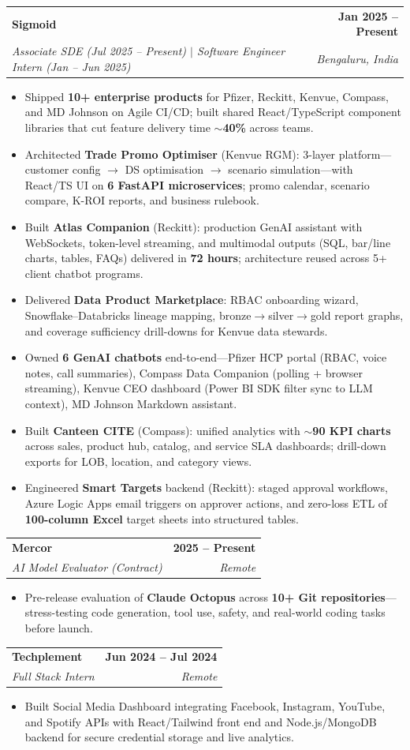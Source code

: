 \documentclass[letterpaper,11pt]{article}
\makeatletter
\newcommand{\resumeItem}[1]{
  \item\small{
    {#1 \vspace{-2pt}}
  }
}
\newcommand{\resumeSubheading}[4]{
  \vspace{-2pt}\item
    \begin{tabular*}{1.0\textwidth}[t]{l@{\extracolsep{\fill}}r}
      \textbf{#1} & \textbf{\small #2} \\
      \textit{\small#3} & \textit{\small #4} \\
    \end{tabular*}\vspace{-7pt}
}
\newcommand{\resumeItemListStart}{\begin{itemize}}
\newcommand{\resumeItemListEnd}{\end{itemize}\vspace{-5pt}}
\makeatother
\begin{document}
    \resumeSubheading
      {Sigmoid}{Jan 2025 -- Present}
      {Associate SDE (Jul 2025 -- Present) $|$ Software Engineer Intern (Jan -- Jun 2025)}{Bengaluru, India}
      \resumeItemListStart
        \resumeItem{Shipped \textbf{10+ enterprise products} for Pfizer, Reckitt, Kenvue, Compass, and MD Johnson on Agile CI/CD; built shared React/TypeScript component libraries that cut feature delivery time \textbf{$\sim$40\%} across teams.}
        \resumeItem{Architected \textbf{Trade Promo Optimiser} (Kenvue RGM): 3-layer platform---customer config $\rightarrow$ DS optimisation $\rightarrow$ scenario simulation---with React/TS UI on \textbf{6 FastAPI microservices}; promo calendar, scenario compare, K-ROI reports, and business rulebook.}
        \resumeItem{Built \textbf{Atlas Companion} (Reckitt): production GenAI assistant with WebSockets, token-level streaming, and multimodal outputs (SQL, bar/line charts, tables, FAQs) delivered in \textbf{72 hours}; architecture reused across 5+ client chatbot programs.}
        \resumeItem{Delivered \textbf{Data Product Marketplace}: RBAC onboarding wizard, Snowflake--Databricks lineage mapping, bronze$\rightarrow$silver$\rightarrow$gold report graphs, and coverage sufficiency drill-downs for Kenvue data stewards.}
        \resumeItem{Owned \textbf{6 GenAI chatbots} end-to-end---Pfizer HCP portal (RBAC, voice notes, call summaries), Compass Data Companion (polling + browser streaming), Kenvue CEO dashboard (Power BI SDK filter sync to LLM context), MD Johnson Markdown assistant.}
        \resumeItem{Built \textbf{Canteen CITE} (Compass): unified analytics with $\sim$\textbf{90 KPI charts} across sales, product hub, catalog, and service SLA dashboards; drill-down exports for LOB, location, and category views.}
        \resumeItem{Engineered \textbf{Smart Targets} backend (Reckitt): staged approval workflows, Azure Logic Apps email triggers on approver actions, and zero-loss ETL of \textbf{100-column Excel} target sheets into structured tables.}
      \resumeItemListEnd

    \resumeSubheading
      {Mercor}{2025 -- Present}
      {AI Model Evaluator (Contract)}{Remote}
      \resumeItemListStart
        \resumeItem{Pre-release evaluation of \textbf{Claude Octopus} across \textbf{10+ Git repositories}---stress-testing code generation, tool use, safety, and real-world coding tasks before launch.}
      \resumeItemListEnd

    \resumeSubheading
      {Techplement}{Jun 2024 -- Jul 2024}
      {Full Stack Intern}{Remote}
      \resumeItemListStart
        \resumeItem{Built Social Media Dashboard integrating Facebook, Instagram, YouTube, and Spotify APIs with React/Tailwind front end and Node.js/MongoDB backend for secure credential storage and live analytics.}
      \resumeItemListEnd
\end{document}

